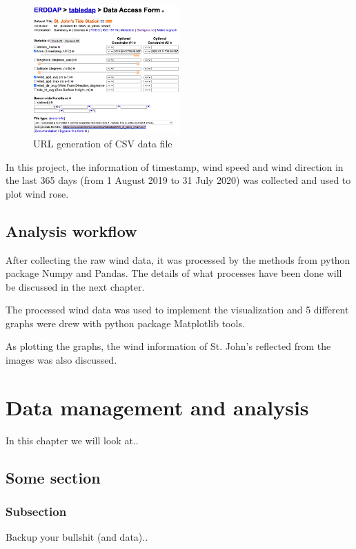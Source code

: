 \documentclass[10pt]{report}
\begin{document}
\begin{figure}[h!]
    \centering
    \includegraphics[width=0.50\textwidth]{images/data_source.png}
    \caption{URL generation of CSV data file}
    \label{fig: PaleBlueDot}    
\end{figure}

In this project, the information of timestamp, wind speed and wind direction in the last 365 days (from 1 August 2019 to 31 July 2020) was collected and used to plot wind rose.\par

\section{Analysis workflow}
After collecting the raw wind data, it was processed by the methods from python package Numpy and Pandas. The details of what processes have been done will be discussed in the next chapter.\par
The processed wind data was used to implement the visualization and 5 different graphs were drew with python package Matplotlib tools.\par
As plotting the graphs, the wind information of St. John's reflected from the images was also discussed.


\chapter{Data management and analysis}
In this chapter we will look at..

\section{Some section}

\subsection{Subsection}
Backup your bullshit (and data)..
\end{document}

